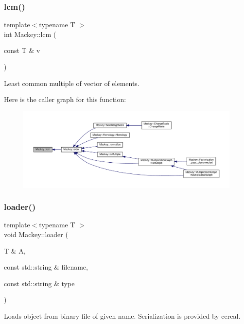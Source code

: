 \subsubsection{\texorpdfstring{lcm()}{lcm()}}
{\footnotesize\ttfamily template$<$typename T $>$ \\
int Mackey\+::lcm (\begin{DoxyParamCaption}\item[{const T \&}]{v }\end{DoxyParamCaption})}



Least common multiple of vector of elements. 

Here is the caller graph for this function\+:\nopagebreak
\begin{figure}[H]
\begin{center}
\leavevmode
\includegraphics[width=350pt]{namespaceMackey_a5d8ae76ffb9440e27bfca124d26ee1b2_icgraph}
\end{center}
\end{figure}
\mbox{\label{namespaceMackey_a735958355cdca12e0d312b7e604f28bc}} 
\subsubsection{\texorpdfstring{loader()}{loader()}}
{\footnotesize\ttfamily template$<$typename T $>$ \\
void Mackey\+::loader (\begin{DoxyParamCaption}\item[{T \&}]{A,  }\item[{const std\+::string \&}]{filename,  }\item[{const std\+::string \&}]{type }\end{DoxyParamCaption})}



Loads object from binary file of given name. Serialization is provided by cereal. 

